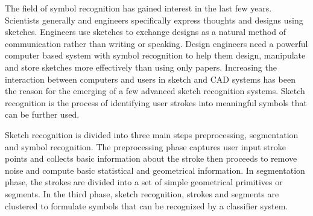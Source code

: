 \documentclass[10pt]{article}
\begin{document}



The field of symbol recognition has gained interest in the last few years. Scientists generally and engineers specifically express thoughts and designs using sketches. Engineers use sketches to exchange designs as a natural method of communication rather than writing or speaking. Design engineers need a powerful computer based system with symbol recognition to help them design, manipulate and store sketches more effectively than using only papers. Increasing the interaction between computers and users in sketch and CAD systems has been the reason for the emerging of a few advanced sketch recognition systems. Sketch recognition is the process of identifying user strokes into meaningful symbols that can be further used.  

Sketch recognition is divided into three main steps preprocessing, segmentation and symbol recognition. The preprocessing phase captures user input stroke points and collects basic information about the stroke then proceeds to remove noise and compute basic statistical and geometrical information. In segmentation phase, the strokes are divided into a set of simple geometrical primitives or segments. In the third phase, sketch recognition, strokes and segments are clustered to formulate symbols that can be recognized by a classifier system.

\end{document}
